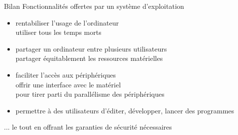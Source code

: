 \begin {frame} {Bilan}
    Fonctionnalités offertes par un système d'exploitation

    \begin {itemize}
	\item rentabiliser l'usage de l'ordinateur
	    \\
	    \implique utiliser tous les temps morts
	\item partager un ordinateur entre plusieurs utilisateurs
	    \\
	    \implique partager équitablement les ressources matérielles

	\item faciliter l'accès aux périphériques
	    \\
	    \implique offrir une interface avec le matériel
	    \\
	    \implique pour tirer parti du parallélisme des périphériques

	\item permettre à des utilisateurs d'éditer, développer,
	    lancer des programmes
    \end {itemize}

    ... le tout en offrant les garanties de sécurité nécessaires
\end {frame}



